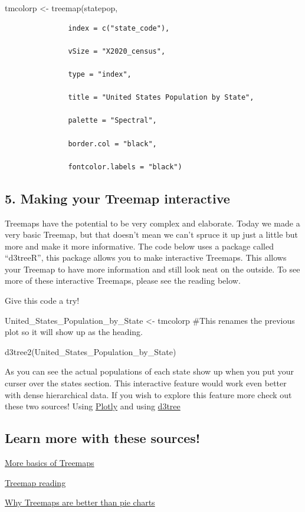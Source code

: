 \documentclass[
]{article}
\begin{document}
tmcolorp \textless- treemap(statepop,

\begin{verbatim}
               index = c("state_code"),
               
               vSize = "X2020_census",
               
               type = "index",
               
               title = "United States Population by State",
               
               palette = "Spectral",
               
               border.col = "black",
               
               fontcolor.labels = "black")
\end{verbatim}

\hypertarget{making-your-treemap-interactive}{%
\subsection{5. Making your Treemap
interactive}\label{making-your-treemap-interactive}}

Treemaps have the potential to be very complex and elaborate. Today we
made a very basic Treemap, but that doesn't mean we can't spruce it up
just a little but more and make it more informative. The code below uses
a package called ``d3treeR'', this package allows you to make
interactive Treemaps. This allows your Treemap to have more information
and still look neat on the outside. To see more of these interactive
Treemaps, please see the reading below.

Give this code a try!

United\_States\_Population\_by\_State \textless- tmcolorp \#This renames
the previous plot so it will show up as the heading.

d3tree2(United\_States\_Population\_by\_State)

As you can see the actual populations of each state show up when you put
your curser over the states section. This interactive feature would work
even better with dense hierarchical data. If you wish to explore this
feature more check out these two sources! Using
\href{https://plotly.com/r/treemaps/}{Plotly} and using
\href{https://d3-graph-gallery.com/treemap.html}{d3tree}

\hypertarget{learn-more-with-these-sources}{%
\subsection{Learn more with these
sources!}\label{learn-more-with-these-sources}}

\href{https://r-graph-gallery.com/236-custom-your-treemap}{More basics
of Treemaps}

\href{https://www.r-bloggers.com/2018/09/simple-steps-to-create-treemap-in-r/}{Treemap
reading}

\href{https://www.data-to-viz.com/caveat/pie.html}{Why Treemaps are
better than pie charts}
\end{document}
